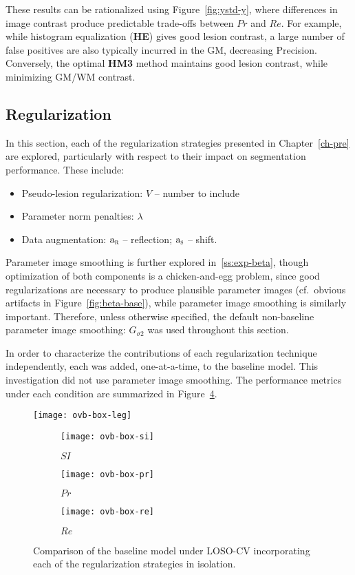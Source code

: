 These results can be rationalized using Figure~\ref{fig:ystd-y},
where differences in image contrast produce predictable trade-offs between $Pr$ and $Re$. %
For example, while histogram equalization (\textbf{HE}) gives good lesion contrast,
a large number of false positives are also typically incurred in the GM,
decreasing Precision.
Conversely, the optimal \textbf{HM3} method maintains good lesion contrast,
while minimizing GM/WM contrast.
\subsection{Regularization}\label{ss:exp-reg}
In this section, each of the regularization strategies
presented in Chapter~\ref{ch-pre} are explored,
particularly with respect to their impact on segmentation performance.
These include:
\begin{itemize}[itemsep=0pt,topsep=0pt]
  \item Pseudo-lesion regularization: $V$ -- number to include
  \item Parameter norm penalties: $\lambda$
  \item Data augmentation:
    $\mathrm{a}_{\textsc{r}}$ -- reflection;
    $\mathrm{a}_{\textsc{s}}$ -- shift.
\end{itemize}
Parameter image smoothing is further explored in~\ref{ss:exp-beta},
though optimization of both components is a chicken-and-egg problem,
since good regularizations are necessary to produce plausible parameter images
(cf.~obvious artifacts in Figure~\ref{fig:beta-base}),
while parameter image smoothing is similarly important.
Therefore, unless otherwise specified,
the default non-baseline parameter image smoothing: $G_{\sigma2}$ was used throughout this section.
\par
In order to characterize the contributions of each regularization technique independently,
each was added, one-at-a-time, to the baseline model.
This investigation did not use parameter image smoothing.
The performance metrics under each condition are summarized in Figure~\ref{fig:seg-box-ovb}.
\par
\begin{figure}
  \centering
  \texttt{[image: ovb-box-leg]}\\[0.5em]
  \begin{subfigure}{0.32\textwidth}
    \centering\texttt{[image: ovb-box-si]}
    \caption{$SI$}%
    \label{fig:seg-box-ovb-si}
  \end{subfigure}
  \begin{subfigure}{0.32\textwidth}
    \centering\texttt{[image: ovb-box-pr]}
    \caption{$Pr$}%
    \label{fig:seg-box-ovb-pr}
  \end{subfigure}
  \begin{subfigure}{0.32\textwidth}
    \centering\texttt{[image: ovb-box-re]}
    \caption{$Re$}%
    \label{fig:seg-box-ovb-re}
  \end{subfigure}
  \caption{Comparison of the baseline model under LOSO-CV
    incorporating each of the regularization strategies in isolation.}%
  \label{fig:seg-box-ovb}
\end{figure}
